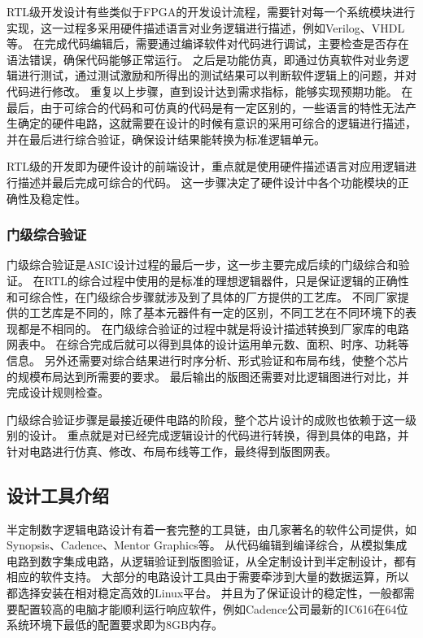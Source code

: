 \documentclass[UTF8]{ctexart}
\begin{document}
RTL级开发设计有些类似于FPGA的开发设计流程，需要针对每一个系统模块进行实现，这一过程多采用硬件描述语言对业务逻辑进行描述，例如Verilog、VHDL等\cite{xiecs2001}。
在完成代码编辑后，需要通过编译软件对代码进行调试，主要检查是否存在语法错误，确保代码能够正常运行。
之后是功能仿真，即通过仿真软件对业务逻辑进行测试，通过测试激励和所得出的测试结果可以判断软件逻辑上的问题，并对代码进行修改。
重复以上步骤，直到设计达到需求指标，能够实现预期功能。
在最后，由于可综合的代码和可仿真的代码是有一定区别的，一些语言的特性无法产生确定的硬件电路，这就需要在设计的时候有意识的采用可综合的逻辑进行描述，并在最后进行综合验证，确保设计结果能转换为标准逻辑单元。

RTL级的开发即为硬件设计的前端设计，重点就是使用硬件描述语言对应用逻辑进行描述并最后完成可综合的代码。
这一步骤决定了硬件设计中各个功能模块的正确性及稳定性。

\subsubsection{门级综合验证}

门级综合验证是ASIC设计过程的最后一步，这一步主要完成后续的门级综合和验证。
在RTL的综合过程中使用的是标准的理想逻辑器件，只是保证逻辑的正确性和可综合性，在门级综合步骤就涉及到了具体的厂方提供的工艺库。
不同厂家提供的工艺库是不同的，除了基本元器件有一定的区别，不同工艺在不同环境下的表现都是不相同的。
在门级综合验证的过程中就是将设计描述转换到厂家库的电路网表中。
在综合完成后就可以得到具体的设计运用单元数、面积、时序、功耗等信息。
另外还需要对综合结果进行时序分析、形式验证和布局布线，使整个芯片的规模布局达到所需要的要求。
最后输出的版图还需要对比逻辑图进行对比，并完成设计规则检查。

门级综合验证步骤是最接近硬件电路的阶段，整个芯片设计的成败也依赖于这一级别的设计。
重点就是对已经完成逻辑设计的代码进行转换，得到具体的电路，并针对电路进行仿真、修改、布局布线等工作，最终得到版图网表。

\subsection{设计工具介绍}

半定制数字逻辑电路设计有着一套完整的工具链，由几家著名的软件公司提供，如Synopsis、Cadence、Mentor Graphics等。
从代码编辑到编译综合，从模拟集成电路到数字集成电路，从逻辑验证到版图验证，从全定制设计到半定制设计，都有相应的软件支持。
大部分的电路设计工具由于需要牵涉到大量的数据运算，所以都选择安装在相对稳定高效的Linux平台。
并且为了保证设计的稳定性，一般都需要配置较高的电脑才能顺利运行响应软件，例如Cadence公司最新的IC616在64位系统环境下最低的配置要求即为8GB内存。
\end{document}
